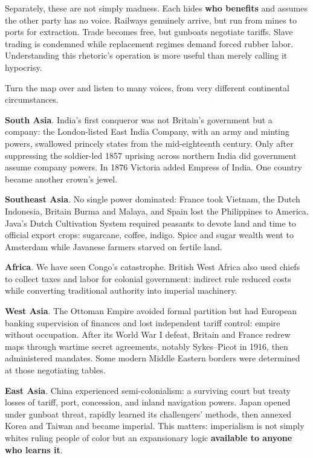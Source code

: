 Separately, these are not simply madness. Each hides \textbf{who benefits} and assumes the other party has no voice. Railways genuinely arrive, but run from mines to ports for extraction. Trade becomes free, but gunboats negotiate tariffs. Slave trading is condemned while replacement regimes demand forced rubber labor. Understanding this rhetoric's operation is more useful than merely calling it hypocrisy.

Turn the map over and listen to many voices, from very different continental circumstances.

\textbf{South Asia}. India's first conqueror was not Britain's government but a company: the London-listed East India Company, with an army and minting powers, swallowed princely states from the mid-eighteenth century. Only after suppressing the soldier-led 1857 uprising across northern India did government assume company powers. In 1876 Victoria added Empress of India. One country became another crown's jewel.

\textbf{Southeast Asia}. No single power dominated: France took Vietnam, the Dutch Indonesia, Britain Burma and Malaya, and Spain lost the Philippines to America. Java's Dutch Cultivation System required peasants to devote land and time to official export crops: sugarcane, coffee, indigo. Spice and sugar wealth went to Amsterdam while Javanese farmers starved on fertile land.

\textbf{Africa}. We have seen Congo's catastrophe. British West Africa also used chiefs to collect taxes and labor for colonial government: indirect rule reduced costs while converting traditional authority into imperial machinery.

\textbf{West Asia}. The Ottoman Empire avoided formal partition but had European banking supervision of finances and lost independent tariff control: empire without occupation. After its World War I defeat, Britain and France redrew maps through wartime secret agreements, notably Sykes--Picot in 1916, then administered mandates. Some modern Middle Eastern borders were determined at those negotiating tables.

\textbf{East Asia}. China experienced semi-colonialism: a surviving court but treaty losses of tariff, port, concession, and inland navigation powers. Japan opened under gunboat threat, rapidly learned its challengers' methods, then annexed Korea and Taiwan and became imperial. This matters: imperialism is not simply whites ruling people of color but an expansionary logic \textbf{available to anyone who learns it}.


